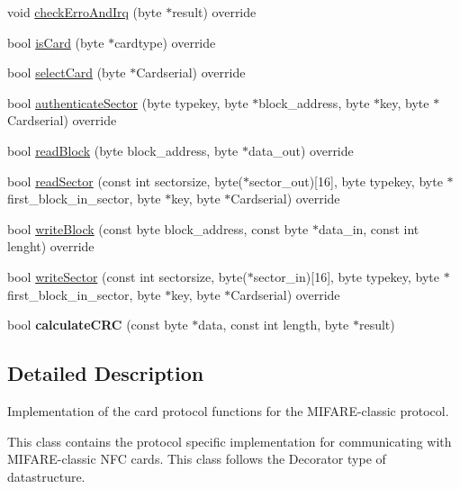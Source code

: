 \begin{DoxyCompactItemize}
\item 
void \hyperlink{class_mifare___classic_a9377d560c083320ad3b605df464a29e4}{check\+Erro\+And\+Irq} (byte $\ast$result) override
\item 
bool \hyperlink{class_mifare___classic_ae02721fc8b9268e93778fdc47d06d162}{is\+Card} (byte $\ast$cardtype) override
\item 
bool \hyperlink{class_mifare___classic_aaa549c00df8619bb2f5a96bba093f005}{select\+Card} (byte $\ast$Cardserial) override
\item 
bool \hyperlink{class_mifare___classic_a2e79d1842e44e1600f59fdfba4b22470}{authenticate\+Sector} (byte typekey, byte $\ast$block\+\_\+address, byte $\ast$key, byte $\ast$Cardserial) override
\item 
bool \hyperlink{class_mifare___classic_a6401f278760213b5c53e3c41aa5b0c98}{read\+Block} (byte block\+\_\+address, byte $\ast$data\+\_\+out) override
\item 
bool \hyperlink{class_mifare___classic_a7caca9ec9a0cdc116f8056753ecc438c}{read\+Sector} (const int sectorsize, byte($\ast$sector\+\_\+out)\mbox{[}16\mbox{]}, byte typekey, byte $\ast$first\+\_\+block\+\_\+in\+\_\+sector, byte $\ast$key, byte $\ast$Cardserial) override
\item 
bool \hyperlink{class_mifare___classic_adb793958d3f2601d336165e383a456f6}{write\+Block} (const byte block\+\_\+address, const byte $\ast$data\+\_\+in, const int lenght) override
\item 
bool \hyperlink{class_mifare___classic_a127803e07c148fe8d447a00e28be4a90}{write\+Sector} (const int sectorsize, byte($\ast$sector\+\_\+in)\mbox{[}16\mbox{]}, byte typekey, byte $\ast$first\+\_\+block\+\_\+in\+\_\+sector, byte $\ast$key, byte $\ast$Cardserial) override
\item 
bool {\bfseries calculate\+C\+RC} (const byte $\ast$data, const int length, byte $\ast$result)\hypertarget{class_mifare___classic_a915b02fa2f126741de96ce6224503ff6}{}\label{class_mifare___classic_a915b02fa2f126741de96ce6224503ff6}

\end{DoxyCompactItemize}


\subsection{Detailed Description}
Implementation of the card protocol functions for the M\+I\+F\+A\+R\+E-\/classic protocol.

This class contains the protocol specific implementation for communicating with M\+I\+F\+A\+R\+E-\/classic N\+FC cards. This class follows the Decorator type of datastructure. 

